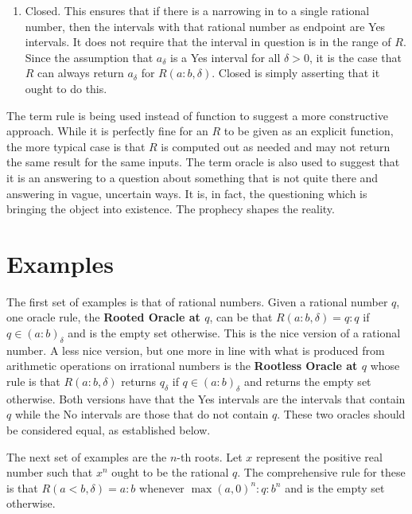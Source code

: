 \documentclass[12pt]{article}
\begin{document}
\begin{enumerate}
    \item Closed. This ensures that if there is a narrowing in to a single rational number, then the intervals with that rational number as endpoint are Yes intervals. It does not require that the interval in question is in the range of $R$. Since the assumption that $a_\delta$ is a Yes interval for all $\delta >0$, it is the case that $R$ can always return $a_\delta$ for $R(a:b, \delta)$. Closed is simply asserting that it ought to do this. 

\end{enumerate}

The term rule is being used instead of function to suggest a more constructive approach. While it is perfectly fine for an $R$ to be given as an explicit function, the more typical case is that $R$ is computed out as needed and may not return the same result for the same inputs. The term oracle is also used to suggest that it is an answering to a question about something that is not quite there and answering in vague, uncertain ways. It is, in fact, the questioning which is bringing the object into existence. The prophecy shapes the reality. 


\section{Examples}

The first set of examples is that of rational numbers. Given a rational number $q$, one oracle rule, the \textbf{Rooted Oracle at $q$}, can be that $R(a:b, \delta) = q:q$ if $q \in (a:b)_\delta$ and is the empty set otherwise. This is the nice version of a rational number. A less nice version, but one more in line with what is produced from arithmetic operations on irrational numbers is the \textbf{Rootless Oracle at $q$} whose rule is that $R(a:b, \delta)$ returns $q_\delta$ if $q \in (a:b)_\delta$ and returns the empty set otherwise. Both versions have that the Yes intervals are the intervals that contain $q$ while the No intervals are those that do not contain $q$. These two oracles should be considered equal, as established below. 

The next set of examples are the $n$-th roots. Let $x$ represent the positive real number such that $x^n$ ought to be the rational $q$. The comprehensive rule for these is that $R(a\lt b, \delta) = a:b$ whenever $\max(a, 0)^n:q:b^n$ and is the empty set otherwise.
\end{document}
